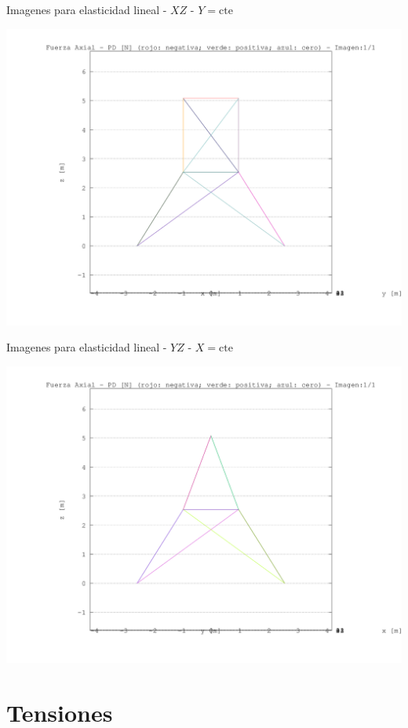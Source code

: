 \documentclass[a4paper,11pt]{article}
\begin{document}
\begin{center}       
Imagenes para elasticidad lineal -  $XZ$ - $Y=\text{cte}$ 

\includegraphics[width=.80\textwidth]{../../XY_XZ_YZ/XZ/fuerza_axial/torre_fuerza_axial_XZ_1.png}      

\end{center}       
\newpage       
\begin{center}       
Imagenes para elasticidad lineal -  $YZ$ - $X=\text{cte}$ 

\includegraphics[width=.80\textwidth]{../../XY_XZ_YZ/YZ/fuerza_axial/torre_fuerza_axial_YZ_1.png}      

\end{center}       
\newpage       

\section{Tensiones}
\end{document}
